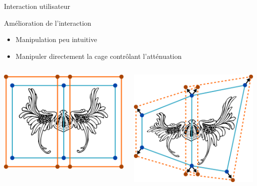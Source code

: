 \documentclass[xcolor=x11names,compress]{beamer}
\renewcommand{\(}{\begin{columns}} \renewcommand{\)}{\end{columns}}
\newcommand{\<}[1]{\begin{column}{#1}} \renewcommand{\>}{\end{column}}
\begin{document}
\begin{frame}{Interaction utilisateur}
\centering
{}
\end{frame}

\begin{frame}{Amélioration de l'interaction}
  \begin{itemize}
    \item Manipulation peu intuitive
    \item Manipuler directement la cage contrôlant l'atténuation
  \end{itemize}
  \begin{columns}[t]
    \begin{column}{0.5\textwidth}
      \centering
      \includegraphics[scale=0.15]{Deformation-Viking-Avant}
    \end{column}
    \begin{column}{0.5\textwidth}
      \centering
      \includegraphics[scale=0.15]{Deformation-Viking-Apres-Avec}
    \end{column}
  \end{columns}
\end{frame}
\end{document}
